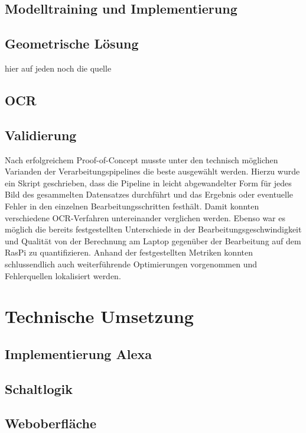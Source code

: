 \section{Modelltraining und Implementierung}

\section{Geometrische Lösung}
hier auf jeden noch die quelle 

\section{OCR}

\section{Validierung}
Nach erfolgreichem Proof-of-Concept musste unter den technisch möglichen Varianden der Verarbeitungspipelines die beste ausgewählt werden. Hierzu wurde ein Skript geschrieben, dass die Pipeline in leicht abgewandelter Form für jedes Bild des gesammelten Datensatzes durchführt und das Ergebnis oder eventuelle Fehler in den einzelnen Bearbeitungsschritten festhält. Damit konnten verschiedene OCR-Verfahren untereinander verglichen werden. Ebenso war es möglich die bereits festgestellten Unterschiede in der Bearbeitungsgeschwindigkeit und Qualität von der Berechnung am Laptop gegenüber der Bearbeitung auf dem RasPi zu quantifizieren. Anhand der festgestellten Metriken konnten schlussendlich auch weiterführende Optimierungen vorgenommen und Fehlerquellen lokalisiert werden.


\chapter{Technische Umsetzung}

\section{Implementierung Alexa}
\section{Schaltlogik}
\section{Weboberfläche}


